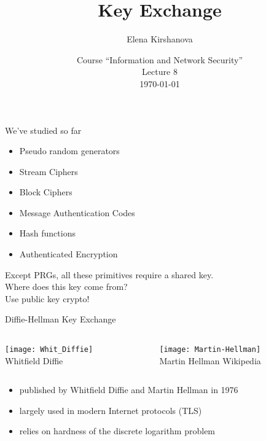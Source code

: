\documentclass[usenames,dvipsnames, 9pt]{beamer}
\author{Elena Kirshanova \\ [10pt]
}
\title{\Huge Key Exchange}
\date{ Course ``Information and Network Security'' \\ 	
	Lecture 8 \\ \today }
\begin{document}
	
\begin{frame}
	\titlepage
\end{frame}

\begin{frame}{We've studied so far}
	\Large 
	\begin{itemize}
		\item  {\color{Orange} Pseudo random generators} 
		\item {\color{Orange} Stream Ciphers} 
		\item {\color{Orange} Block Ciphers} 
		\item {\color{Orange} Message Authentication Codes}
		\item {\color{Orange} Hash functions}  
		\item {\color{Orange} Authenticated Encryption}  
	\end{itemize}

\vspace{15pt}
\centering
\pause 
Except PRGs, all these primitives require {\color{Orange} a shared key}.\\[10pt]
Where does this key come from? \\[10pt]
\pause
Use public key crypto!

\end{frame}

\begin{frame}{Diffie-Hellman Key Exchange}
\centering
\begin{columns}
	\begin{column}{0.5\textwidth}
		\texttt{[image: Whit\_Diffie]}\\
		Whitfield Diffie
	\end{column}
	\begin{column}{0.5\textwidth}
	\texttt{[image: Martin-Hellman]}\\
	Martin Hellman \hfill 	\small \textcopyright Wikipedia
\end{column}
\end{columns}
\vspace{15pt}
\large
	\begin{itemize}
		\item published by Whitfield Diffie and Martin Hellman in 1976
		\item largely used in modern Internet protocols (TLS)
		\item relies on hardness of the discrete logarithm problem
	\end{itemize}
\end{frame}
\end{document}
